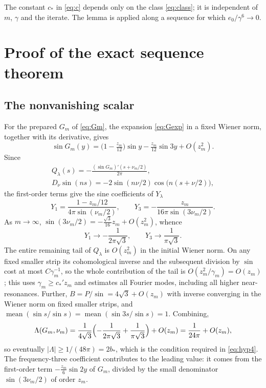 \documentclass[11pt]{amsart}
\numberwithin{equation}{section}
\theoremstyle{definition}
\theoremstyle{remark}
\newcommand{\abs}[1]{\lvert #1\rvert}
\newcommand{\mean}{\operatorname{mean}}
\begin{document}
The constant $c_*$ in \eqref{eq:c} depends only on the class \eqref{eq:class}; it is independent of $m$, $\gamma$ and the iterate. The lemma is applied along a sequence for which $e_0/\gamma^6\to0$.

\section{Proof of the exact sequence theorem}\label{sec:d4proof}

\subsection{The nonvanishing scalar}
For the prepared $G_m$ of \eqref{eq:Gm}, the expansion \eqref{eq:Gexp} in a fixed Wiener norm, together with its derivative, gives
\[
\sin G_m(y)=\bigl(1-\tfrac{z_m}{12}\bigr)\sin y-\tfrac{z_m}{12}\sin3y+O(z_m^2).
\]
Since
\begin{gather*}
Q_\lambda(s)=-\frac{(\sin G_m)'(s+\nu_m/2)}{2\pi},\\
D_\nu\sin(ns)=-2\sin(n\nu/2)\cos\bigl(n(s+\nu/2)\bigr),
\end{gather*}
the first-order terms give the sine coefficients of $Y_\lambda$
\begin{equation}\label{eq:Y13}
Y_1=\frac{1-z_m/12}{4\pi\sin(\nu_m/2)},\qquad Y_3=-\frac{z_m}{16\pi\sin(3\nu_m/2)} .
\end{equation}
As $m\to\infty$, $\sin(3\nu_m/2)=-\tfrac{\sqrt3}{16}z_m+O(z_m^2)$, whence
\begin{equation}\label{eq:Y13lim}
Y_1\to-\frac1{2\pi\sqrt3},\qquad Y_3\to\frac1{\pi\sqrt3}.
\end{equation}
The entire remaining tail of $Q_\lambda$ is $O(z_m^2)$ in the initial Wiener norm. On any fixed smaller strip its cohomological inverse and the subsequent division by $\sin$ cost at most $C\gamma_m^{-1}$, so the whole contribution of the tail is $O(z_m^2/\gamma_m)=O(z_m)$; this uses $\gamma_m\ge c_*'z_m$ and estimates all Fourier modes, including all higher near-resonances. Further, $B=P/\sin=4\sqrt3+O(z_m)$ with inverse converging in the Wiener norm on fixed smaller strips, and $\mean(\sin s/\sin s)=\mean(\sin3s/\sin s)=1$. Combining,
\begin{equation}\label{eq:Lam13}
\Lambda(G_m,\nu_m)=\frac1{4\sqrt3}\Bigl(-\frac1{2\pi\sqrt3}+\frac1{\pi\sqrt3}\Bigr)+O(z_m)=\frac1{24\pi}+O(z_m),
\end{equation}
so eventually $\abs\Lambda\ge1/(48\pi)=2b_*$, which is the condition required in \eqref{eq:hyp4}. The frequency-three coefficient contributes to the leading value: it comes from the first-order term $-\frac{z_m}6\sin2y$ of $G_m$, divided by the small denominator $\sin(3\nu_m/2)$ of order $z_m$.
\end{document}
